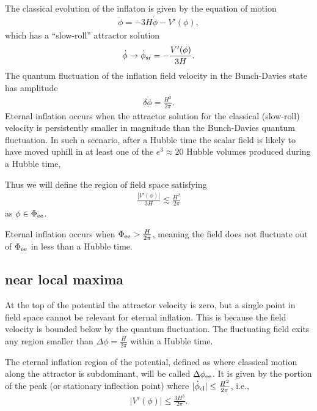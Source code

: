 \documentclass[aps,amsfonts,amsmath,prd,preprint,nofootinbib,superscriptaddress]{revtex4}
\newcommand{\MMp}{{M_P^2}}
\begin{document}
\begin{appendix}
The classical evolution of the inflaton is given by the equation of motion
\begin{align}
\ddot \phi = -3 H \dot \phi - V'(\phi),
\end{align}
which has a ``slow-roll'' attractor solution
\begin{align}
\dot \phi \to \dot \phi_{\rm sr} = -\frac{V'(\phi)}{3 H}.
\end{align}
 The quantum fluctuation of the inflation field velocity in the Bunch-Davies state has amplitude
\begin{align}
\delta \dot \phi = \frac{H^2}{2\pi}.
\end{align} 
Eternal inflation occurs when the attractor solution for the classical (slow-roll) velocity
is persistently smaller in magnitude than the Bunch-Davies quantum fluctuation.  In such a scenario, after a Hubble
time the scalar field is likely to have moved uphill in at least one of the $e^3\approx 20$ Hubble volumes produced during
a Hubble time, 

Thus we will define the region of field space satisfying
\begin{align}
\frac{\left| V'(\phi)\right|}{3 H} \lesssim  \frac{H^2}{2\pi}
\end{align}
as $\phi \in \Phi_{\rm ee}$.

Eternal inflation occurs when $\Phi_{\rm ee} > \frac{H}{2\pi}$, meaning the field does not fluctuate out of $\Phi_{\rm ee}$ in less than a Hubble time.


\subsection{near local maxima}\label{app:sei}
At the top of the potential the attractor velocity is zero, but a single point in field space cannot be relevant for eternal inflation\cite{Barenboim:2016mmw}.  
This is because the field velocity is bounded below by the quantum fluctuation.  
The fluctuating field exits any region smaller than $\Delta\phi = \frac{H}{2\pi}$ within a Hubble time.  



The eternal inflation region of the potential, defined as where classical motion along the attractor is subdominant, will be called $\Delta\phi_{\rm ee}$.  
It is given by the portion of the peak (or stationary inflection point) where $|\dot\phi_{\rm cl}| \leq \frac{H^2}{2\pi}$, i.e.,
\begin{align}
\left|V'(\phi)\right| \leq \frac{3 H^3}{2\pi}.
\end{align}


\end{appendix}
\end{document}
